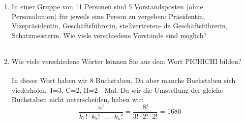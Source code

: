\begin{enumerate}[label=(\alph*)]
        \item In einer Gruppe von 11 Personen sind 5 Vorstandsposten (ohne Personalunion) für jeweils
        eine Person zu vergeben: Präsidentin, Vizepräsidentin, Geschäftsführerin, stellvertreten-
        de Geschäftsführerin, Schatzmeisterin. Wie viele verschiedene Vorstände sind möglich?\\\\

        \item Wie viele verschiedene Wörter können Sie aus dem Wort PICHICHI bilden?\\\\
        In dieser Wort haben wir 8 Buchstaben. Da aber manche Buchstaben sich viederholen: 
        I=3, C=2, H=2 - Mal. Da wir die Umstellung der gleiche Buchstaben nicht unterscheiden, haben wir:
        \[\frac{n!}{k_1!\cdot k_2!\cdot\ldots\cdot k_n!} = \frac{8!}{3!\cdot2!\cdot2!} = 1680\]		
	\end{enumerate}
